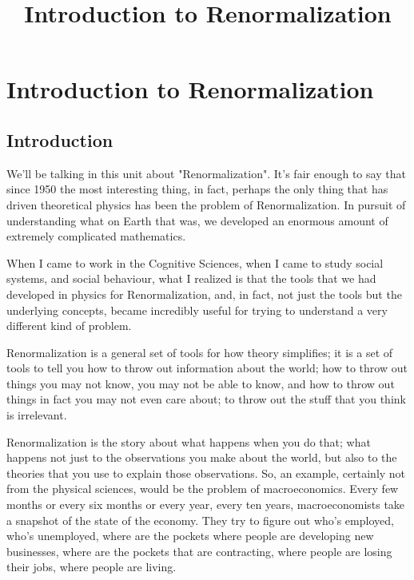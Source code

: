 \documentclass[]{article}
\title{Introduction to Renormalization}
\author{}
\begin{document}
\maketitle

\begin{abstract}

\end{abstract}

\tableofcontents[]

\section{Introduction to Renormalization}

\subsection{Introduction}

We'll be talking in this 
unit about "Renormalization". It's fair enough to say that since 1950 the most interesting thing, in fact, perhaps the only thing that has driven theoretical physics has been the problem of Renormalization. In pursuit of understanding 
what on Earth that was, we developed an enormous amount of extremely complicated mathematics.

When I came to work in the Cognitive 
Sciences, when I came to study social systems, and social behaviour, 
what I realized is that the tools that we had developed in physics for Renormalization, and, in fact, not just the tools but the underlying 
concepts, became incredibly useful for trying to understand a very different kind of problem.

Renormalization is a general set of tools for how theory simplifies; it is a set of tools to tell you how to throw out information about the world; how to throw out things you may not know, you may not be able to know, and how to throw out 
things in fact you may not even care about; to throw out the stuff that you think is irrelevant.

Renormalization is the story about what happens when you do that; what happens not just to the observations you make about the world, but also to the theories that you use to explain those observations. So, an example, certainly not from the physical sciences, would be the problem of macroeconomics. Every few months or every six months or every year, every ten years, macroeconomists take a snapshot
of the state of the economy. They try to figure out who's employed, who's unemployed, where are the pockets where people are developing new businesses, where are the pockets that are contracting, where people are losing their jobs, where people are living.
\end{document}
